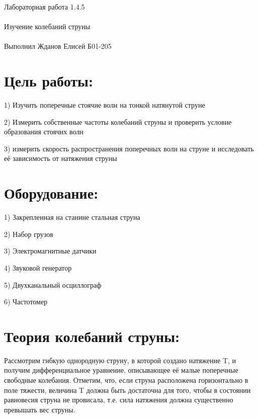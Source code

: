 \documentclass{astroedu-lab}
\begin{document}
\pagestyle{plain}

\begin{problem}{\huge Лабораторная работа 1.4.5\\\\Изучение колебаний струны\\\\Выполнил Жданов Елисей Б01-205}

\section{Цель работы:}

1) Изучить поперечные стоячие волн на тонкой натянутой струне

2) Измерить собственные частоты колебаний струны и проверить условие образования стоячих волн

3) измерить скорость распространения поперечных волн на струне и исследовать её зависимость от натяжения струны

\section{Оборудование:}

1) Закрепленная на станине стальная струна

2) Набор грузов

3) Электромагнитные датчики

4) Звуковой генератор 

5) Двухканальный осциллограф

6) Частотомер

\section{Теория колебаний струны:}

Рассмотрим гибкую однородную струну, в которой создано натяжение T, и получим дифференциальное уравнение, описывающее её малые поперечные свободные колебания. Отметим, что, если струна расположена горизонтально в поле тяжести, величина T должна быть достаточна для того, чтобы в состоянии равновесия струна не провисала, т.е. сила натяжения должна существенно превышать вес струны.

\newpage


\end{problem}
\end{document}
